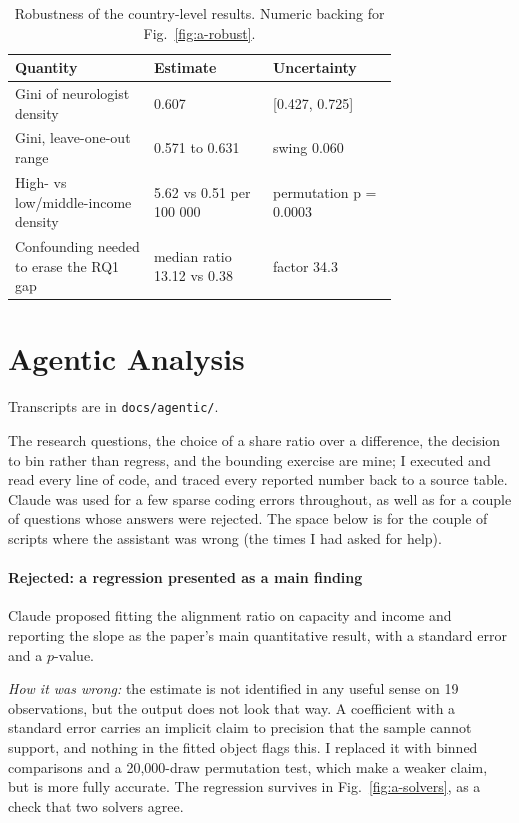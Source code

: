 \documentclass[9pt,twoside]{pnas-new}
\begin{document}
\begin{table}[!ht]
\centering

\caption{Robustness of the country-level results. Numeric backing for Fig.~\ref{fig:a-robust}.}
\label{tab:a-robust}
\footnotesize
\begin{tabular}{p{0.28\linewidth}p{0.24\linewidth}p{0.24\linewidth}}
\toprule
Quantity & Estimate & Uncertainty \\
\midrule
Gini of neurologist density & 0.607 & [0.427, 0.725] \\
Gini, leave-one-out range & 0.571 to 0.631 & swing 0.060 \\
High- vs low/middle-income density & 5.62 vs 0.51 per 100 000 & permutation p = 0.0003 \\
Confounding needed to erase the RQ1 gap & median ratio 13.12 vs 0.38 & factor 34.3 \\
\bottomrule
\end{tabular}
\end{table}

\FloatBarrier

\section*{Agentic Analysis}

Transcripts are in
\texttt{docs/agentic/}. 

The research questions, the choice of a share
ratio over a difference, the decision to bin rather than regress, and the
bounding exercise are mine; I executed and read every line of code, and traced
every reported number back to a source table. Claude was used for a few sparse coding errors throughout, as well as for a couple of questions whose answers were rejected. The space below is for the couple of
scripts where the assistant was wrong (the times I had asked for help).

\paragraph{Rejected: a regression presented as a main finding} Claude
proposed fitting the alignment ratio on capacity and income and reporting the
slope as the paper's main quantitative result, with a standard error and a
$p$-value.

\emph{How it was wrong:} the estimate is not identified in any useful sense on
19 observations, but the output does not look that way. A coefficient with a
standard error carries an implicit claim to precision that the sample cannot
support, and nothing in the fitted object flags this. I replaced it with binned
comparisons and a 20{,}000-draw permutation test, which make a weaker claim, but is more fully accurate. The regression survives in Fig.~\ref{fig:a-solvers}, as a check
that two solvers agree.
\end{document}
